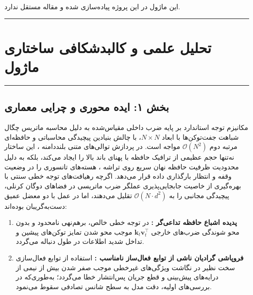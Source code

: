 \clearpage
{}
\vspace*{0.2cm}

این ماژول در این پروژه پیاده‌سازی شده و مقاله مستقل ندارد.
\noindent\rule{\textwidth}{1.2pt}
\vspace*{0.1cm}
\section{تحلیل علمی و کالبدشکافی ساختاری ماژول }
\label{sec:mod_halo_regla}
\vspace*{-0.2cm}
\noindent\rule{\textwidth}{0.5pt}
\vspace*{0.3cm}

\subsection*{بخش ۱: ایده محوری و چرایی معماری }
مکانیزم توجه استاندارد بر پایه ضرب داخلی مقیاس‌شده  به دلیل محاسبه ماتریس چگال شباهت جفت‌توکن‌ها با ابعاد $N \times N$، با چالش بنیادین پیچیدگی محاسباتی و حافظه‌ای مرتبه دوم $\mathcal{O}(N^2)$ مواجه است. در پردازش توالی‌های متنی بلنددامنه ، این ساختار نه‌تنها حجم عظیمی از ترافیک حافظه با پهنای باند بالا  را ایجاد می‌کند، بلکه به دلیل محدودیت ظرفیت حافظه نهان سریع روی تراشه ، هسته‌های تانسوری را در وضعیت وقفه و انتظار بارگذاری داده قرار می‌دهد. اگرچه رهیافت‌های توجه خطی سنتی با بهره‌گیری از خاصیت جابجایی‌پذیری عملگر ضرب ماتریسی در فضاهای دوگان کرنلی، پیچیدگی مجانبی را به $\mathcal{O}(N \cdot d^2)$ تقلیل می‌دهند، اما در عمل با دو معضل عمیق دست‌به‌گریبان بوده‌اند:
\begin{enumerate}
    \item \textbf{پدیده اشباع حافظه تداعی‌گر :} در توجه خطی خالص، برهم‌نهی نامحدود و بدون محو شوندگی ضرب‌های خارجی $\mathbf{k}_t \mathbf{v}_t^\top$ موجب محو شدن تمایز توکن‌های پیشین و تداخل شدید اطلاعات در طول دنباله می‌گردد.
    \item \textbf{فروپاشی گرادیان ناشی از توابع فعال‌ساز نامناسب :} استفاده از توابع فعال‌سازی سخت نظیر  در نگاشت ویژگی‌های غیرخطی موجب صفر شدن بیش از نیمی از درایه‌های پیش‌بینی و قطع جریان پس‌انتشار خطا می‌گردد؛ به‌طوری‌که در بررسی‌های اولیه، دقت مدل به سطح شانس تصادفی  سقوط می‌نمود.
\end{enumerate}

